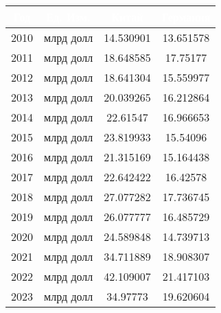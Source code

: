 \begin{tabularx}{\textwidth}{|c|c|c|c|}
    \hline
\rowcolor{black} \textcolor{white}{\textbf{Год}} & \textcolor{white}{\textbf{Ед. Изм.}} & \textcolor{white}{\textbf{Китай}} & \textcolor{white}{\textbf{Германия}} \\ \hline
2010 & млрд долл & 14.530901 & 13.651578 \\ \hline
2011 & млрд долл & 18.648585 & 17.75177 \\ \hline
2012 & млрд долл & 18.641304 & 15.559977 \\ \hline
2013 & млрд долл & 20.039265 & 16.212864 \\ \hline
2014 & млрд долл & 22.61547 & 16.966653 \\ \hline
2015 & млрд долл & 23.819933 & 15.54096 \\ \hline
2016 & млрд долл & 21.315169 & 15.164438 \\ \hline
2017 & млрд долл & 22.642422 & 16.42578 \\ \hline
2018 & млрд долл & 27.077282 & 17.736745 \\ \hline
2019 & млрд долл & 26.077777 & 16.485729 \\ \hline
2020 & млрд долл & 24.589848 & 14.739713 \\ \hline
2021 & млрд долл & 34.711889 & 18.908307 \\ \hline
2022 & млрд долл & 42.109007 & 21.417103 \\ \hline
2023 & млрд долл & 34.97773 & 19.620604 \\ \hline
\end{tabularx}
